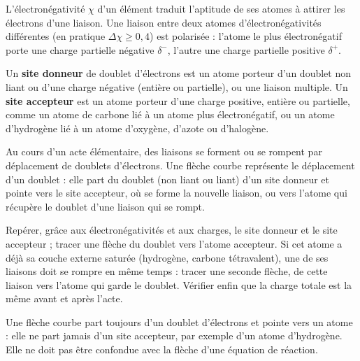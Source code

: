 \begin{definition}
L'électronégativité $\chi$ d'un élément traduit l'aptitude de ses atomes à attirer les électrons d'une liaison.
Une liaison entre deux atomes d'électronégativités différentes (en pratique $\Delta\chi\geq0{,}4$) est polarisée :
l'atome le plus électronégatif porte une charge partielle négative $\delta^-$, l'autre une charge partielle positive $\delta^+$.
\end{definition}
\begin{propriete}
Un \textbf{site donneur} de doublet d'électrons est un atome porteur d'un doublet non liant ou d'une charge négative
(entière ou partielle), ou une liaison multiple. Un \textbf{site accepteur} est un atome porteur d'une charge positive,
entière ou partielle, comme un atome de carbone lié à un atome plus électronégatif, ou un atome d'hydrogène lié à un
atome d'oxygène, d'azote ou d'halogène.
\end{propriete}
\begin{definition}
Au cours d'un acte élémentaire, des liaisons se forment ou se rompent par déplacement de doublets d'électrons. Une
flèche courbe représente le déplacement d'un doublet : elle part du doublet (non liant ou liant) d'un site donneur et
pointe vers le site accepteur, où se forme la nouvelle liaison, ou vers l'atome qui récupère le doublet d'une liaison
qui se rompt.
\end{definition}
\begin{savoirfaire}
Repérer, grâce aux électronégativités et aux charges, le site donneur et le site accepteur ; tracer une flèche du doublet
vers l'atome accepteur. Si cet atome a déjà sa couche externe saturée (hydrogène, carbone tétravalent), une de ses
liaisons doit se rompre en même temps : tracer une seconde flèche, de cette liaison vers l'atome qui garde le doublet.
Vérifier enfin que la charge totale est la même avant et après l'acte.
\end{savoirfaire}
\begin{attention}
Une flèche courbe part toujours d'un doublet d'électrons et pointe vers un atome : elle ne part jamais d'un site
accepteur, par exemple d'un atome d'hydrogène. Elle ne doit pas être confondue avec la flèche d'une équation de réaction.
\end{attention}
